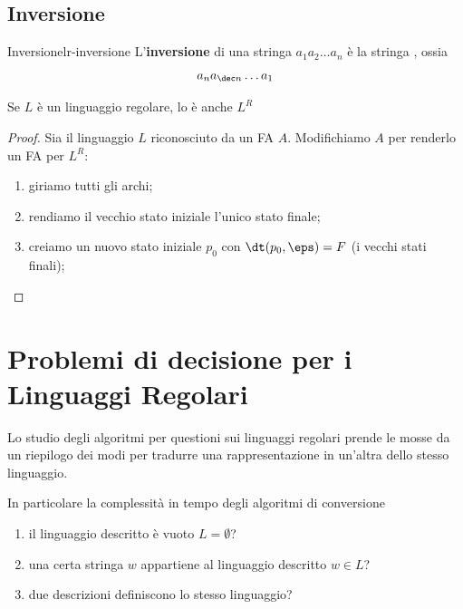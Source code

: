 \subsection{Inversione}\label{sub:lr_inversione} %
\begin{definition}{Inversione}{lr-inversione}
    L'\textbf{inversione} di una stringa $a_1a_2\dots a_n$ è la stringa , ossia
    \[
        a_na_{\dec n}\dots a_1
    \]
    \begin{note}
    \end{note}
\end{definition}
\begin{theorem}{}{}
    Se $L$ è un linguaggio regolare, lo è anche $L^R$
    \begin{proof}
        Sia il linguaggio $L$ riconosciuto da un FA $A$.
        Modifichiamo $A$ per renderlo un FA per $L^R$:
        \begin{enumerate}
            \item giriamo tutti gli archi;
            \item rendiamo il vecchio stato iniziale l'unico stato finale;
            \item creiamo un nuovo stato iniziale $p_0$ con $\dt(p_0,\eps) = F$ (i vecchi stati finali);
        \end{enumerate}
    \end{proof}
\end{theorem}
%
\section{Problemi di decisione per i Linguaggi Regolari}\label{sec:lr_problemi_di_decisione_per_i_linguaggi_regolari} %
Lo studio degli algoritmi per questioni sui linguaggi regolari prende le mosse da un riepilogo dei modi per tradurre una rappresentazione in un'altra dello stesso linguaggio.
\begin{note}
    In particolare la complessità in tempo degli algoritmi di conversione
\end{note}
\begin{enumerate}
    \item il linguaggio descritto è vuoto $L = \emptyset$?
    \item una certa stringa $w$ appartiene al linguaggio descritto $w \in L$?
    \item due descrizioni definiscono lo stesso linguaggio?
\end{enumerate}
%
